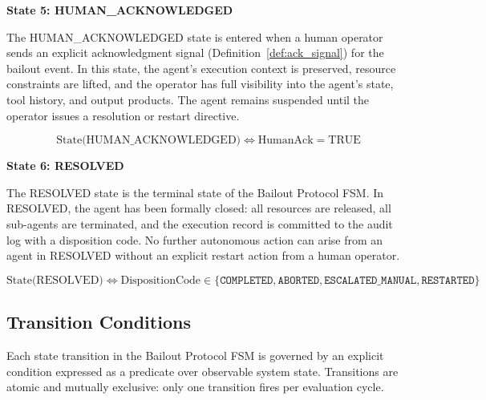 \bigskip
\noindent\textbf{State 5: HUMAN\_ACKNOWLEDGED}

\begin{definition}\label{def:human_acknowledged}
The HUMAN\_ACKNOWLEDGED state is entered when a human operator sends an explicit acknowledgment signal (Definition~\ref{def:ack_signal}) for the bailout event. In this state, the agent's execution context is preserved, resource constraints are lifted, and the operator has full visibility into the agent's state, tool history, and output products. The agent remains suspended until the operator issues a resolution or restart directive.

\[
\text{State(HUMAN\_ACKNOWLEDGED)} \iff \text{HumanAck} = \text{TRUE}
\]
\end{definition}

\bigskip
\noindent\textbf{State 6: RESOLVED}

\begin{definition}\label{def:resolved}
The RESOLVED state is the terminal state of the Bailout Protocol FSM. In RESOLVED, the agent has been formally closed: all resources are released, all sub-agents are terminated, and the execution record is committed to the audit log with a disposition code. No further autonomous action can arise from an agent in RESOLVED without an explicit restart action from a human operator.

\[
\text{State(RESOLVED)} \iff \text{DispositionCode} \in \{\texttt{COMPLETED}, \texttt{ABORTED}, \texttt{ESCALATED\_MANUAL}, \texttt{RESTARTED}\}
\]
\end{definition}

\bigskip
\subsection{Transition Conditions}

Each state transition in the Bailout Protocol FSM is governed by an explicit condition expressed as a predicate over observable system state. Transitions are atomic and mutually exclusive: only one transition fires per evaluation cycle.


